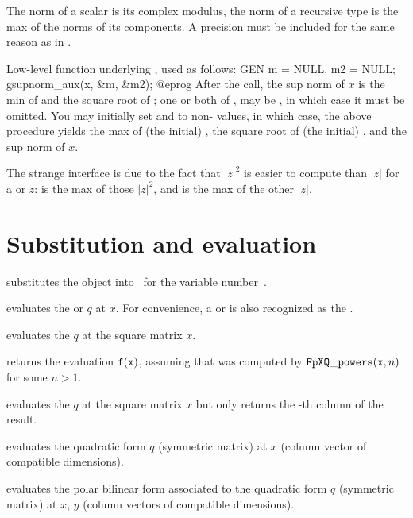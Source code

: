  The norm of a scalar is its complex
modulus, the norm of a recursive type is the max of the norms of its
components. A precision  must be included for the same reason as in
.

 Low-level function underlying
, used as follows:
\bprog
  GEN m = NULL, m2 = NULL;
  gsupnorm_aux(x, &m, &m2);
@eprog
After the call, the sup norm of $x$ is the min of  and the square root
of ;  one or both of ,  may be , in
which case it must be omitted. You may initially set  and  to
non- values, in which case, the above procedure yields the max of
(the initial) , the square root of (the initial) , and the sup
norm of $x$.

The strange interface is due to the fact that $|z|^2$ is easier to compute
than $|z|$ for a  or  $z$:  is the max of
those $|z|^2$, and  is the max of the other $|z|$.

\section{Substitution and evaluation}

 substitutes the object 
into~ for the variable number~.

 evaluates the  or 
$q$ at $x$. For convenience, a  or  is also recognized as
the  .

 evaluates the  $q$ at the
square matrix $x$.

 returns
the evaluation ${\tt f}({\tt x})$, assuming that  was computed by
${\tt FpXQ\_powers}({\tt x}, n)$ for some $n>1$.

 evaluates the  $q$
at the square matrix $x$ but only returns the -th column of the result.

 evaluates the quadratic form
$q$ (symmetric matrix) at $x$ (column vector of compatible dimensions).

 evaluates the polar bilinear form
associated to the quadratic form $q$ (symmetric matrix) at $x$, $y$ (column
vectors of compatible dimensions).

